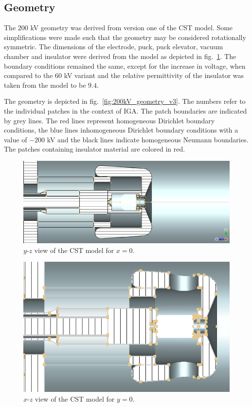 \subsection{Geometry}
The $200$ kV geometry was derived from version one of the CST model. Some simplifications were made such that the geometry may be considered rotationally symmetric. The dimensions of the electrode, puck, puck elevator, vacuum chamber and insulator were derived from the model as depicted in fig.~\ref{fig:cst_geometry_yz}. The boundary conditions remained the same, except for the increase in voltage, when compared to the $60$ kV variant and the relative permittivity of the insulator was taken from the model to be $9.4$.

The geometry is depicted in fig.~\ref{fig:200kV_geometry_v3}. The numbers refer to the individual patches in the context of IGA. The patch boundaries are indicated by grey lines. The red lines represent homogeneous Dirichlet boundary conditions, the blue lines inhomogeneous Dirichlet boundary conditions with a value of $-200$ kV and the black lines indicate homogeneous Neumann boundaries.
The patches containing insulator material are colored in red.

\begin{center}
\begin{figure}[H]
  \includegraphics[width=\textwidth]{figures/200kV/v1_cutx}
  \caption{$y$-$z$ view of the CST model for $x=0$.}
  \label{fig:cst_geometry_yz}
\end{figure}
\end{center}

\begin{center}
\begin{figure}[H]
  \includegraphics[width=\textwidth]{figures/200kV/v1_cuty}
  \caption{$x$-$z$ view of the CST model for $y=0$.}
  \label{fig:cst_geometry_xz}
\end{figure}
\end{center}

